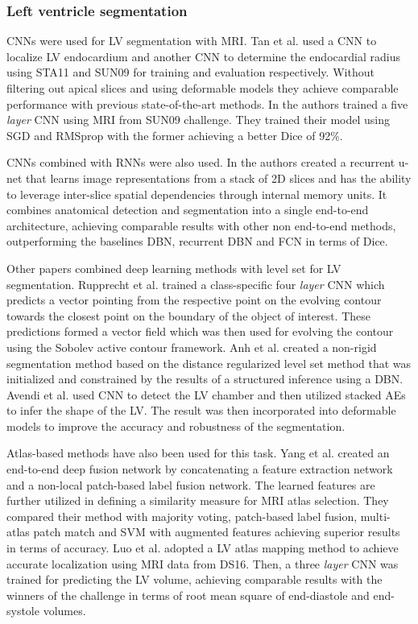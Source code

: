 \documentclass[journal]{IEEEtran}
\begin{document}
\subsubsection{Left ventricle segmentation}
CNNs were used for LV segmentation with MRI\@.
Tan et al.\cite{tan2016cardiac} used a CNN to localize LV endocardium and another CNN to determine the endocardial radius using STA11 and SUN09 for training and evaluation respectively.
Without filtering out apical slices and using deformable models they achieve comparable performance with previous state-of-the-art methods.
In\cite{romaguera2017left} the authors trained a five \textit{layer} CNN using MRI from SUN09 challenge.
They trained their model using SGD and RMSprop with the former achieving a better Dice of 92\%.

CNNs combined with RNNs were also used.
In\cite{poudel2016recurrent} the authors created a recurrent u-net that learns image representations from a stack of 2D slices and has the ability to leverage inter-slice spatial dependencies through internal memory units.
It combines anatomical detection and segmentation into a single end-to-end architecture, achieving comparable results with other non end-to-end methods, outperforming the baselines DBN, recurrent DBN and FCN in terms of Dice.

Other papers combined deep learning methods with level set for LV segmentation.
Rupprecht et al.\cite{rupprecht2016deep} trained a class-specific four \textit{layer} CNN which predicts a vector pointing from the respective point on the evolving contour towards the closest point on the boundary of the object of interest.
These predictions formed a vector field which was then used for evolving the contour using the Sobolev active contour framework.
Anh et al.\cite{anh2014fully} created a non-rigid segmentation method based on the distance regularized level set method that was initialized and constrained by the results of a structured inference using a DBN\@.
Avendi et al.\cite{avendi2016combined} used CNN to detect the LV chamber and then utilized stacked AEs to infer the shape of the LV\@.
The result was then incorporated into deformable models to improve the accuracy and robustness of the segmentation.

Atlas-based methods have also been used for this task.
Yang et al.\cite{yang2016deep} created an end-to-end deep fusion network by concatenating a feature extraction network and a non-local patch-based label fusion network.
The learned features are further utilized in defining a similarity measure for MRI atlas selection.
They compared their method with majority voting, patch-based label fusion, multi-atlas patch match and SVM with augmented features achieving superior results in terms of accuracy.
Luo et al.\cite{luo2016cardiac} adopted a LV atlas mapping method to achieve accurate localization using MRI data from DS16.
Then, a three \textit{layer} CNN was trained for predicting the LV volume, achieving comparable results with the winners of the challenge in terms of root mean square of end-diastole and end-systole volumes.
\end{document}
